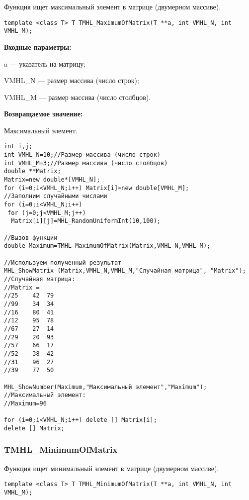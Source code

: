 \documentclass[a4paper,12pt]{article}
\begin{document}
Функция ищет максимальный элемент в матрице (двумерном массиве).


\begin{lstlisting}[label=code_syntax_TMHL_MaximumOfMatrix,caption=Синтаксис]
template <class T> T TMHL_MaximumOfMatrix(T **a, int VMHL_N, int VMHL_M);
\end{lstlisting}

\textbf{Входные параметры:}

 a --- указатель на матрицу;
 
 VMHL\_N --- размер массива (число строк);
 
 VMHL\_M --- размер массива (число столбцов).

\textbf{Возвращаемое значение:}

 Максимальный элемент.


\begin{lstlisting}[label=code_use_TMHL_MaximumOfMatrix,caption=Пример использования]
int i,j;
int VMHL_N=10;//Размер массива (число строк)
int VMHL_M=3;//Размер массива (число столбцов)
double **Matrix;
Matrix=new double*[VMHL_N];
for (i=0;i<VMHL_N;i++) Matrix[i]=new double[VMHL_M];
//Заполним случайными числами
for (i=0;i<VMHL_N;i++)
 for (j=0;j<VMHL_M;j++)
  Matrix[i][j]=MHL_RandomUniformInt(10,100);

//Вызов функции
double Maximum=TMHL_MaximumOfMatrix(Matrix,VMHL_N,VMHL_M);

//Используем полученный результат
MHL_ShowMatrix (Matrix,VMHL_N,VMHL_M,"Случайная матрица", "Matrix");
//Случайная матрица:
//Matrix =
//25	42	79
//99	34	34
//16	80	41
//12	95	78
//67	27	14
//29	20	93
//57	66	17
//52	38	42
//31	96	27
//39	77	50

MHL_ShowNumber(Maximum,"Максимальный элемент","Maximum");
//Максимальный элемент:
//Maximum=96

for (i=0;i<VMHL_N;i++) delete [] Matrix[i];
delete [] Matrix;
\end{lstlisting}

\subsubsection{TMHL\_MinimumOfMatrix}\label{TMHL_MinimumOfMatrix}

Функция ищет минимальный элемент в матрице (двумерном массиве).


\begin{lstlisting}[label=code_syntax_TMHL_MinimumOfMatrix,caption=Синтаксис]
template <class T> T TMHL_MinimumOfMatrix(T **a, int VMHL_N, int VMHL_M);
\end{lstlisting}
\end{document}
